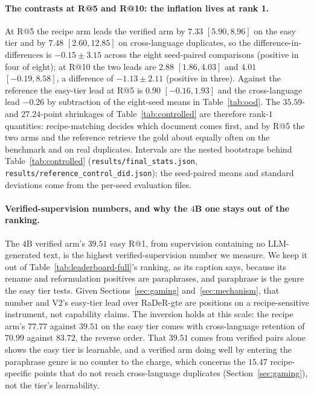 \paragraph{The contrasts at R@5 and R@10: the inflation lives at rank 1.}
At R@5 the recipe arm leads the verified arm by $7.33$ $[5.90, 8.96]$ on the easy tier and by $7.48$ $[2.60, 12.85]$ on cross-language duplicates, so the difference-in-differences is $-0.15 \pm 3.15$ across the eight seed-paired comparisons (positive in four of eight); at R@10 the two leads are $2.88$ $[1.86, 4.03]$ and $4.01$ $[-0.19, 8.58]$, a difference of $-1.13 \pm 2.11$ (positive in three). Against the reference the easy-tier lead at R@5 is $0.90$ $[-0.16, 1.93]$ and the cross-language lead $-0.26$ by subtraction of the eight-seed means in Table~\ref{tab:ood}. The $35.59$- and $27.24$-point shrinkages of Table~\ref{tab:controlled} are therefore rank-$1$ quantities: recipe-matching decides which document comes first, and by R@5 the two arms and the reference retrieve the gold about equally often on the benchmark and on real duplicates. Intervals are the nested bootstraps behind Table~\ref{tab:controlled} (\texttt{results/final\_stats.json}, \texttt{results/reference\_control\_did.json}); the seed-paired means and standard deviations come from the per-seed evaluation files.

\paragraph{Verified-supervision numbers, and why the $4$B one stays out of the ranking.}
The $4$B verified arm's $39.51$ easy R@1, from supervision containing no LLM-generated text, is the highest verified-supervision number we measure. We keep it out of Table~\ref{tab:leaderboard-full}'s ranking, as its caption says, because its rename and reformulation positives are paraphrases, and paraphrase is the genre the easy tier tests. Given Sections~\ref{sec:gaming} and~\ref{sec:mechanism}, that number and V2's easy-tier lead over RaDeR-gte are positions on a recipe-sensitive instrument, not capability claims. The inversion holds at this scale: the recipe arm's $77.77$ against $39.51$ on the easy tier comes with cross-language retention of $70.99$ against $83.72$, the reverse order. That $39.51$ comes from verified pairs alone shows the easy tier is learnable, and a verified arm doing well by entering the paraphrase genre is no counter to the charge, which concerns the $15.47$ recipe-specific points that do not reach cross-language duplicates (Section~\ref{sec:gaming}), not the tier's learnability.

